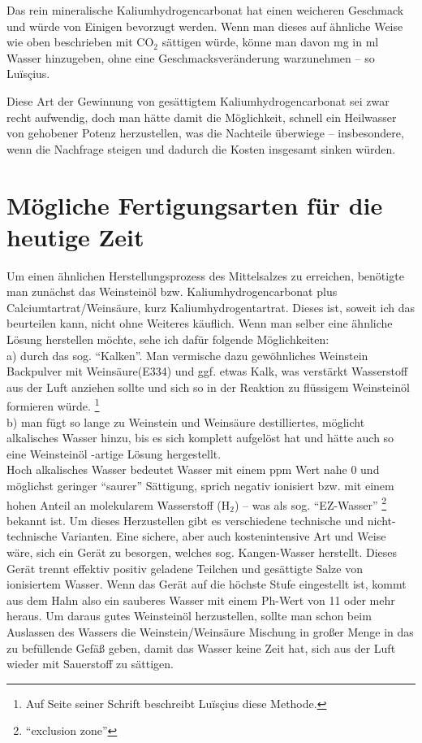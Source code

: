 \documentclass[a5paper,fontsize=10pt]{memoir}
\newcommand\ouncesofpound{12}
\newcommand\quentinsofounce{8}
\newcommand\gransofquentins{63}
\newcommand\gramsofpound{372}
\newcommand\gramofounce{\fpeval{\gramsofpound / \ouncesofpound}}
\newcommand\gramofgran{\fpeval{\gramsofpound / \ouncesofpound / \quentinsofounce / \gransofquentins}}
\begin{document}
\FPeval\x{round(16*\gramofounce:0)}%
\FPeval\x{round(3*\gramofgran*1000:0)}%
Das rein mineralische Kaliumhydrogencarbonat hat einen weicheren Geschmack 
und würde von Einigen bevorzugt werden. 
Wenn man dieses auf ähnliche Weise wie oben beschrieben 
mit CO$_2$ sättigen würde, 
könne man davon \numprint{\x} mg in \numprint{\a} ml Wasser hinzugeben, 
ohne eine Geschmacksveränderung warzunehmen 
-- so Luïsçius.

Diese Art der Gewinnung von gesättigtem Kaliumhydrogencarbonat 
sei zwar recht aufwendig, 
doch man hätte damit die Möglichkeit, 
schnell ein Heilwasser von gehobener Potenz herzustellen, 
was die Nachteile überwiege 
-- insbesondere, wenn die Nachfrage steigen
und dadurch die Kosten insgesamt sinken würden.


\section{Mögliche Fertigungsarten für die heutige Zeit}

Um einen ähnlichen Herstellungsprozess des Mittelsalzes zu erreichen, 
benötigte man zunächst das Weinsteinöl bzw. 
Kaliumhydrogencarbonat plus Calciumtartrat/Weinsäure, 
kurz Kaliumhydrogentartrat. 
Dieses ist, soweit ich das beurteilen kann, nicht ohne Weiteres käuflich. 
Wenn man selber eine ähnliche Lösung herstellen möchte, 
sehe ich dafür folgende Möglichkeiten:\\

a) durch das sog. ``Kalken''.
Man vermische dazu gewöhnliches Weinstein Backpulver
mit Weinsäure(E334) und ggf. etwas Kalk,
was verstärkt Wasserstoff aus der Luft anziehen sollte
und sich so in der Reaktion
zu flüssigem Weinsteinöl formieren würde.%
\footnote{Auf Seite \pageref{whitewashing} seiner Schrift 
beschreibt Luïsçius diese Methode.}\\

b) man fügt so lange zu Weinstein und Weinsäure
destilliertes, möglicht alkalisches Wasser hinzu,
bis es sich komplett aufgelöst hat
und hätte auch so eine Weinsteinöl%
\hyp{}artige Lösung hergestellt.\\

Hoch alkalisches Wasser 
bedeutet Wasser mit einem ppm Wert nahe 0 
und möglichst geringer ``saurer'' Sättigung, 
sprich negativ ionisiert 
bzw. mit einem hohen Anteil an molekularem Wasserstoff (H$_2$) 
-- was als sog. ``EZ-Wasser''%
\footnote{``exclusion zone''}
bekannt ist. 
Um dieses Herzustellen gibt es verschiedene technische 
und nicht-technische Varianten. 
Eine sichere, aber auch kostenintensive Art und Weise wäre, 
sich ein Gerät zu besorgen, welches sog. Kangen-Wasser herstellt. 
Dieses Gerät trennt effektiv positiv geladene Teilchen 
und gesättigte Salze von ionisiertem Wasser. 
Wenn das Gerät auf die höchste Stufe eingestellt ist, 
kommt aus dem Hahn also ein sauberes Wasser 
mit einem Ph-Wert von 11 oder mehr heraus. 
Um daraus gutes Weinsteinöl herzustellen, 
sollte man schon beim Auslassen des Wassers 
die Weinstein/Weinsäure Mischung in großer Menge 
in das zu befüllende Gefäß geben, 
damit das Wasser keine Zeit hat, 
sich aus der Luft wieder mit Sauerstoff zu sättigen.
\end{document}
